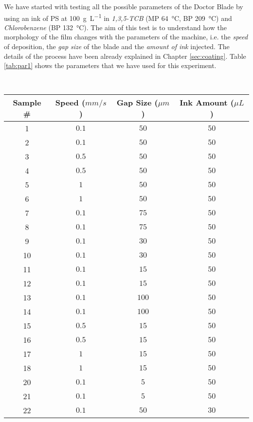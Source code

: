 \documentclass  [
  paper    = a4,
  BCOR     = 10mm,
  twoside,
  fontsize = 12pt,
  fleqn,
  toc      = bibnumbered,
  toc      = listofnumbered,
  numbers  = noendperiod,
  headings = normal,
  listof   = leveldown,
  version  = 3.03
]                                       {scrreprt}
\begin{document}
We have started with testing all the possible parameters of the Doctor Blade by using an ink of PS at \SI[per-mode=symbol]{100}{\gram\per\liter} in \emph{1,3,5-TCB} (MP \SI{64}{\celsius}, BP \SI{209}{\celsius}) and \emph{Chlorobenzene} (BP \SI{132}{\celsius}). The aim of this test is to understand how the morphology of the film changes with the parameters of the machine, i.e. the \emph{speed} of deposition, the \emph{gap size} of the blade and the \emph{amount of ink} injected. The details of the process have been already explained in Chapter \ref{sec:coating}. Table \ref{tab:par1} shows the parameters that we have used for this experiment.  
\begin{table*}[tb]\scriptsize
	\caption{\small Parameters used for Doctor Blading by using $PS$ at \SI[per-mode=symbol]{100}{\gram\per\liter} in 1,3,5-TCB and CB as ink.}
	\label{tab:par1}
	~\\
	\centering
	\begin{tabular}{c|ccc}
		\textbf{Sample \#} & \textbf{Speed} ($mm/s$) & \textbf{Gap Size} ($\mu m$)& \textbf{Ink Amount} ($\mu L$)\\
		\hline
		1 & $0.1$ & $50$ & $50$\\
		2 & $0.1$ & $50$ & $50$\\
		3 & $0.5$ & $50$ & $50$\\
		4 & $0.5$ & $50$ & $50$\\
		5 & $1$ & $50$ & $50$\\
		6 & $1$ & $50$ & $50$\\
		\midrule
		7 & $0.1$ & $75$ & $50$\\
		8 & $0.1$ & $75$ & $50$\\
		9 & $0.1$ & $30$ & $50$\\
		10 & $0.1$ & $30$ & $50$\\
		11 & $0.1$ & $15$ & $50$\\
		12 & $0.1$ & $15$ & $50$\\
		13 & $0.1$ & $100$ & $50$\\
		14 & $0.1$ & $100$ & $50$\\
		\midrule
		15 & $0.5$ & $15$ & $50$\\
		16 & $0.5$ & $15$ & $50$\\
		17 & 	$1$ & $15$ & $50$\\
		18 & $1$ & $15$ & $50$\\
		\midrule
		20 & $0.1$ & $5$ & $50$\\
		21 & $0.1$ & $5$ & $50$\\
		\midrule
		22 & $0.1$ & $50$ & $30$\\

\end{tabular}
\end{table*}
\end{document}
